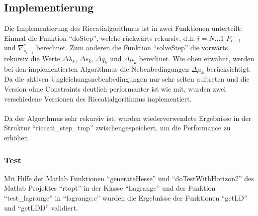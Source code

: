 \subsection{Implementierung}
Die Implementierung des Riccatialgorithmus ist in zwei Funktionen unterteilt: Einmal die Funktion ``doStep'', welche rückwärts rekursiv, d.h. $i = N \dotso 1$ $P_{i-1}$ und $\nabla_{s_{i-1}}^{*}$ berechnet. Zum anderen die Funktion ``solveStep'' die vorwärts rekursiv die Werte $\Delta \lambda_k$, $\Delta s_k$, $\Delta q_k$ und $\Delta \mu_k$ berechnet. Wie oben erwähnt, werden bei den implementierten Algorithmus die Nebenbedingungen $\Delta \mu_k$ berücksichtigt. Da die aktiven Ungleichungsnebenbedingungen nur sehr selten auftreten und die Version ohne Constraints deutlich performanter ist wie mit, wurden zwei verschiedene Versionen des Riccatialgorithmus implementiert.\\\\
Da der Algorthmus sehr rekursiv ist, wurden wiederverwendete Ergebnisse in der Struktur ``riccati\_step\_tmp'' zwischengespeichert, um die Performance zu erhöhen.
\subsubsection{Test}
Mit Hilfe der Matlab Funktionen ``generateHesse'' und ``doTestWithHorizon2'' des Matlab Projektes ``rtopt'' in der Klasse ``Lagrange'' und der Funktion ``test\_lagrange'' in ``lagrange.c'' wurden die Ergebnisse der Funktionen ``getLD'' und ``getLDD'' validiert. 
